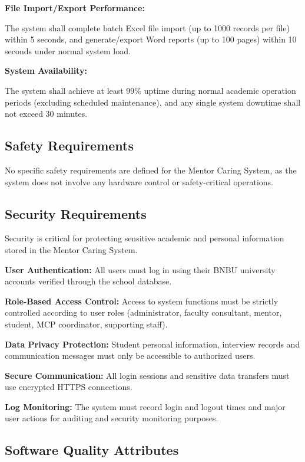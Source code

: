 \documentclass[a4paper,12pt]{article}
\begin{document}
\textbf{File Import/Export Performance:}

The system shall complete batch Excel file import (up to 1000 records per file) within 5 seconds, and generate/export Word reports (up to 100 pages) within 10 seconds under normal system load.

\textbf{System Availability:}

The system shall achieve at least 99\% uptime during normal academic operation periods (excluding scheduled maintenance), and any single system downtime shall not exceed 30 minutes.

\subsection{Safety Requirements}

No specific safety requirements are defined for the Mentor Caring System, as the system does not involve any hardware control or safety-critical operations.

\subsection{Security Requirements}

Security is critical for protecting sensitive academic and personal information stored in the Mentor Caring System.

\textbf{User Authentication:} All users must log in using their BNBU university accounts verified through the school database.

\textbf{Role-Based Access Control:} Access to system functions must be strictly controlled according to user roles (administrator, faculty consultant, mentor, student, MCP coordinator, supporting staff).

\textbf{Data Privacy Protection:} Student personal information, interview records and communication messages must only be accessible to authorized users.

\textbf{Secure Communication:} All login sessions and sensitive data transfers must use encrypted HTTPS connections.

\textbf{Log Monitoring:} The system must record login and logout times and major user actions for auditing and security monitoring purposes.

\subsection{Software Quality Attributes}
\end{document}
